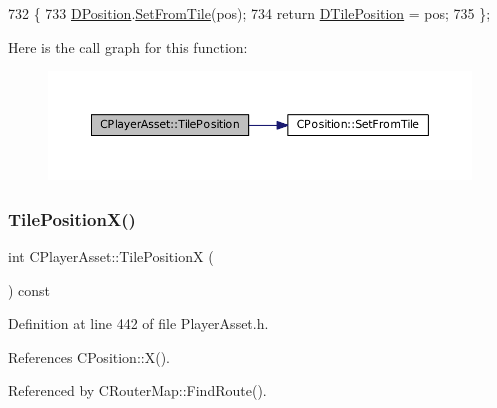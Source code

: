 \begin{DoxyCode}
732                                                         \{
733     \hyperlink{classCPlayerAsset_aa9f53c009b181c7c5647c6b03776a04c}{DPosition}.\hyperlink{classCPosition_a46994e6a8b8e3b4237edd7259ad844b6}{SetFromTile}(pos);
734     \textcolor{keywordflow}{return} \hyperlink{classCPlayerAsset_a5b59a9d3b7db8c7fa194b80dafb96186}{DTilePosition} = pos;
735 \};
\end{DoxyCode}
Here is the call graph for this function\+:\nopagebreak
\begin{figure}[H]
\begin{center}
\leavevmode
\includegraphics[width=350pt]{classCPlayerAsset_a6d84105b6db136a6846fcaf80dba3747_cgraph}
\end{center}
\end{figure}
\hypertarget{classCPlayerAsset_aeabaa8fe7161cce571b6c4d2f7180085}{}\label{classCPlayerAsset_aeabaa8fe7161cce571b6c4d2f7180085} 
\subsubsection{\texorpdfstring{Tile\+Position\+X()}{TilePositionX()}\hspace{0.1cm}{\footnotesize\ttfamily [1/2]}}
{\footnotesize\ttfamily int C\+Player\+Asset\+::\+Tile\+PositionX (\begin{DoxyParamCaption}{ }\end{DoxyParamCaption}) const\hspace{0.3cm}{\ttfamily [inline]}}



Definition at line 442 of file Player\+Asset.\+h.



References C\+Position\+::\+X().



Referenced by C\+Router\+Map\+::\+Find\+Route().


